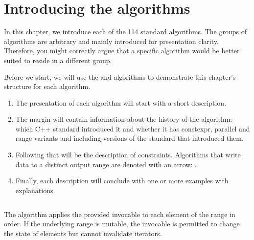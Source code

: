 \section{Introducing the algorithms}

In this chapter, we introduce each of the 114 standard algorithms. The groups of algorithms are arbitrary and mainly introduced for presentation clarity. Therefore, you might correctly argue that a specific algorithm would be better suited to reside in a different group.

Before we start, we will use the  and  algorithms to demonstrate this chapter's structure for each algorithm.

\begin{enumerate}[label=\protect\circled{\arabic*}]
    \item The presentation of each algorithm will start with a short description.
    \item The margin will contain information about the history of the algorithm: which C++ standard introduced it and whether it has constexpr, parallel and range variants and including versions of the standard that introduced them.
    \item Following that will be the description of constraints. Algorithms that write data to a distinct output range are denoted with an arrow: \newline{}.
    \item Finally, each description will conclude with one or more examples with explanations.
\end{enumerate}

\subsection{\texorpdfstring{}{\texttt{std::for\_each}}}

 The  algorithm applies the provided invocable to each element of the range in order. If the underlying range is mutable, the invocable is permitted to change the state of elements but cannot invalidate iterators.


